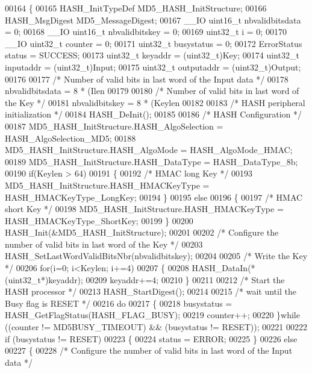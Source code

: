 \begin{DoxyCode}
00164 \{
00165   HASH_InitTypeDef MD5\_HASH\_InitStructure;
00166   HASH_MsgDigest MD5\_MessageDigest;
00167   \_\_IO uint16\_t nbvalidbitsdata = 0;
00168   \_\_IO uint16\_t nbvalidbitskey = 0;
00169   uint32\_t i = 0;
00170   \_\_IO uint32\_t counter = 0;
00171   uint32\_t busystatus = 0;
00172   ErrorStatus status = SUCCESS;
00173   uint32\_t keyaddr    = (uint32\_t)Key;
00174   uint32\_t inputaddr  = (uint32\_t)Input;
00175   uint32\_t outputaddr = (uint32\_t)Output;
00176 
00177   \textcolor{comment}{/* Number of valid bits in last word of the Input data */}
00178   nbvalidbitsdata = 8 * (Ilen %
00179 
00180   \textcolor{comment}{/* Number of valid bits in last word of the Key */}
00181   nbvalidbitskey = 8 * (Keylen %
00182    
00183   \textcolor{comment}{/* HASH peripheral initialization */}
00184   HASH_DeInit();
00185 
00186   \textcolor{comment}{/* HASH Configuration */}
00187   MD5\_HASH\_InitStructure.HASH_AlgoSelection = HASH_AlgoSelection_MD5;
00188   MD5\_HASH\_InitStructure.HASH_AlgoMode = HASH_AlgoMode_HMAC;
00189   MD5\_HASH\_InitStructure.HASH_DataType = HASH_DataType_8b;
00190   \textcolor{keywordflow}{if}(Keylen > 64)
00191   \{
00192     \textcolor{comment}{/* HMAC long Key */}
00193     MD5\_HASH\_InitStructure.HASH_HMACKeyType = HASH_HMACKeyType_LongKey;
00194   \}
00195   \textcolor{keywordflow}{else}
00196   \{
00197     \textcolor{comment}{/* HMAC short Key */}
00198     MD5\_HASH\_InitStructure.HASH_HMACKeyType = HASH_HMACKeyType_ShortKey;
00199   \}
00200   HASH_Init(&MD5\_HASH\_InitStructure);
00201 
00202   \textcolor{comment}{/* Configure the number of valid bits in last word of the Key */}
00203   HASH_SetLastWordValidBitsNbr(nbvalidbitskey);
00204 
00205   \textcolor{comment}{/* Write the Key */}
00206   \textcolor{keywordflow}{for}(i=0; i<Keylen; i+=4)
00207   \{
00208     HASH_DataIn(*(uint32\_t*)keyaddr);
00209     keyaddr+=4;
00210   \}
00211   
00212   \textcolor{comment}{/* Start the HASH processor */}
00213   HASH_StartDigest();
00214 
00215   \textcolor{comment}{/* wait until the Busy flag is RESET */}
00216   \textcolor{keywordflow}{do}
00217   \{
00218     busystatus = HASH_GetFlagStatus(HASH_FLAG_BUSY);
00219     counter++;
00220   \}\textcolor{keywordflow}{while} ((counter != MD5BUSY_TIMEOUT) && (busystatus != RESET));
00221 
00222   \textcolor{keywordflow}{if} (busystatus != RESET)
00223   \{
00224      status = ERROR;
00225   \}
00226   \textcolor{keywordflow}{else}
00227   \{
00228     \textcolor{comment}{/* Configure the number of valid bits in last word of the Input data */}

\end{DoxyCode}

